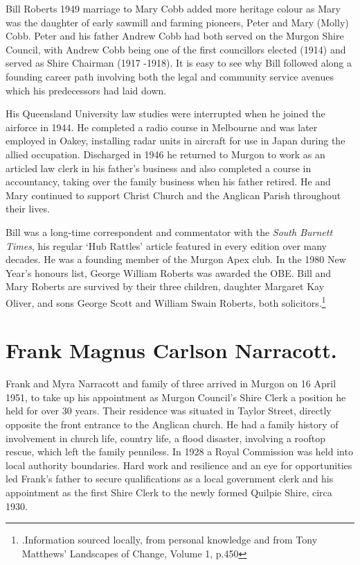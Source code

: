 Bill Roberts 1949 marriage to Mary Cobb added more heritage colour as Mary was the daughter of early sawmill and farming pioneers, Peter and Mary (Molly) Cobb. Peter and his father Andrew Cobb had both served on the Murgon Shire Council, with Andrew Cobb being one of the first councillors elected (1914) and served as Shire Chairman (1917 -1918). It is easy to see why Bill followed along a founding career path involving both the legal and community service avenues which his predecessors had laid down.

His Queensland University law studies were interrupted when he joined the airforce in 1944. He completed a radio course in Melbourne and was later employed in Oakey, installing radar units in aircraft for use in Japan during the allied occupation. Discharged in 1946 he returned to Murgon to work as an articled law clerk in his father's business and also completed a course in accountancy, taking over the family business when his father retired. He and Mary continued to support Christ Church and the Anglican Parish throughout their lives.

Bill was a long-time correspondent and commentator with the \emph{South Burnett Times}, his regular `Hub Rattles' article featured in every edition over many decades. He was a founding member of the Murgon Apex club. In the 1980 New Year's honours list, George William Roberts was awarded the OBE. Bill and Mary Roberts are survived by their three children, daughter Margaret Kay Oliver, and sons George Scott and William Swain Roberts, both solicitors.\footnote{.Information sourced locally, from personal knowledge and from Tony Matthews' Landscapes of Change, Volume 1, p.450}

\hypertarget{frank-magnus-carlson-narracott.}{%
\section{Frank Magnus Carlson Narracott.}\label{frank-magnus-carlson-narracott.}}

Frank and Myra Narracott and family of three arrived in Murgon on 16 April 1951, to take up his appointment as Murgon Council's Shire Clerk a position he held for over 30 years. Their residence was situated in Taylor Street, directly opposite the front entrance to the Anglican church. He had a family history of involvement in church life, country life, a flood disaster, involving a rooftop rescue, which left the family penniless. In 1928 a Royal Commission was held into local authority boundaries. Hard work and resilience and an eye for opportunities led Frank's father to secure qualifications as a local government clerk and his appointment as the first Shire Clerk to the newly formed Quilpie Shire, circa 1930.

